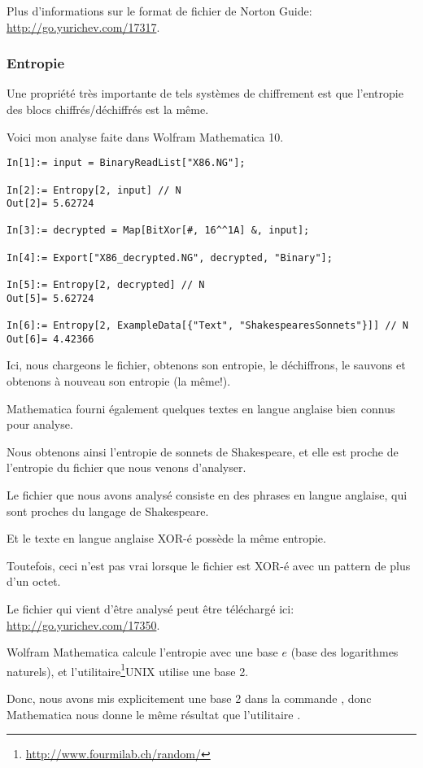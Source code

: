 Plus d'informations sur le format de fichier de Norton Guide: \url{http://go.yurichev.com/17317}.

\subsubsection{Entropie}

Une propriété très importante de tels systèmes de chiffrement est que l'entropie
des blocs chiffrés/déchiffrés est la même.

Voici mon analyse faite dans Wolfram Mathematica 10.

\begin{lstlisting}[caption=Wolfram Mathematica 10,style=custommath]
In[1]:= input = BinaryReadList["X86.NG"];

In[2]:= Entropy[2, input] // N
Out[2]= 5.62724

In[3]:= decrypted = Map[BitXor[#, 16^^1A] &, input];

In[4]:= Export["X86_decrypted.NG", decrypted, "Binary"];

In[5]:= Entropy[2, decrypted] // N
Out[5]= 5.62724

In[6]:= Entropy[2, ExampleData[{"Text", "ShakespearesSonnets"}]] // N
Out[6]= 4.42366
\end{lstlisting}

Ici, nous chargeons le fichier, obtenons son entropie, le déchiffrons, le sauvons
et obtenons à nouveau son entropie (la même!).

Mathematica fourni également quelques textes en langue anglaise bien connus pour
analyse.

Nous obtenons ainsi l'entropie de sonnets de Shakespeare, et elle est proche de l'entropie
du fichier que nous venons d'analyser.

Le fichier que nous avons analysé consiste en des phrases en langue anglaise, qui
sont proches du langage de Shakespeare.

Et le texte en langue anglaise XOR-é possède la même entropie.

Toutefois, ceci n'est pas vrai lorsque le fichier est XOR-é avec un pattern de plus
d'un octet.

Le fichier qui vient d'être analysé peut être téléchargé ici: \url{http://go.yurichev.com/17350}.


\newcommand{\FNENTURL}{\footnote{\url{http://www.fourmilab.ch/random/}}}

Wolfram Mathematica calcule l'entropie avec une base $e$ (base des logarithmes naturels),
et l'utilitaire\FNENTURL UNIX  utilise une base 2.

Donc, nous avons mis explicitement une base 2 dans la commande , donc
Mathematica nous donne le même résultat que l'utilitaire .

